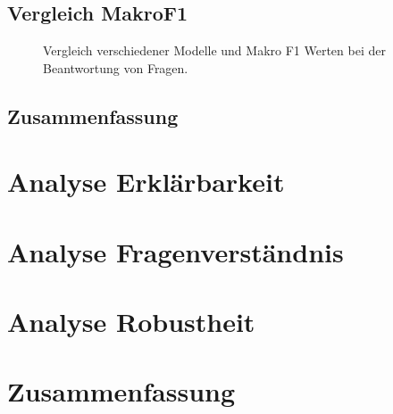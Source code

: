 \subsection{Vergleich MakroF1}
\begin{figure}
    \caption{Vergleich verschiedener Modelle und Makro F1 Werten bei der Beantwortung von Fragen.}
    \label{fig:results:makro_total}
\end{figure}
\subsection{Zusammenfassung}
\section{Analyse Erklärbarkeit}\label{sec:results:explainability}
\section{Analyse Fragenverständnis}\label{sec:results:questionunderstanding}
\section{Analyse Robustheit}\label{sec:results:robustness}
\section{Zusammenfassung}\label{sec:results:summary}


